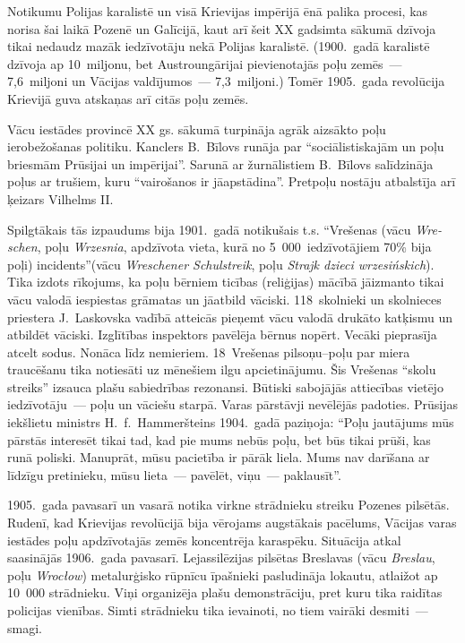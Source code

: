 \documentclass[twoside,a5paper,12pt,fleqn,openany]{extbook}
\newcommand{\pltxti}[1]{\textit{\textpolish{#1}}}
\newcommand{\detxti}[1]{\textit{\textgerman{#1}}}
\begin{document}
Notikumu Polijas karalistē un visā Krievijas impērijā ēnā palika procesi, kas norisa šai laikā Pozenē un Galīcijā, kaut arī šeit XX gadsimta sākumā dzīvoja tikai nedaudz mazāk iedzīvotāju nekā Polijas karalistē. (1900.~gadā karalistē dzīvoja ap 10~miljonu, bet Austroungārijai pievienotajās poļu zemēs~--- 7,6~miljoni un Vācijas valdījumos~--- 7,3~miljoni.) Tomēr 1905.~gada revolūcija Krievijā guva atskaņas arī citās poļu zemēs.

Vācu iestādes  provincē XX gs. sākumā turpināja agrāk aizsākto poļu ierobežošanas politiku. Kanclers B.~Bīlovs runāja par ``sociālistiskajām un poļu briesmām Prūsijai un impērijai''. Sarunā ar žurnālistiem B.~Bīlovs salīdzināja poļus ar trušiem, kuru ``vairošanos ir jāapstādina''. Pretpoļu nostāju atbalstīja arī ķeizars Vilhelms II.

Spilgtākais tās izpaudums bija 1901.~gadā notikušais t.s. ``Vrešenas (vācu \detxti{Wreschen}, poļu \pltxti{Wrzesnia}, apdzīvota vieta, kurā no 5~000~iedzīvotājiem 70\% bija poļi) incidents''(vācu \detxti{Wreschener Schulstreik}, poļu \pltxti{Strajk dzieci wrzesińskich}). Tika izdots rīkojums, ka poļu bērniem ticības (reliģijas) mācībā jāizmanto tikai vācu valodā iespiestas grāmatas un jāatbild vāciski. 118~skolnieki un skolnieces priestera J.~Laskovska vadībā atteicās pieņemt vācu valodā drukāto katķismu un atbildēt vāciski. Izglītības inspektors pavēlēja bērnus nopērt. Vecāki pieprasīja atcelt sodus. Nonāca līdz nemieriem. 18~Vrešenas pilsoņu--poļu par miera traucēšanu tika notiesāti uz mēnešiem ilgu apcietinājumu. Šis Vrešenas ``skolu streiks'' izsauca plašu sabiedrības rezonansi. Būtiski sabojājās attiecības vietējo iedzīvotāju~--- poļu un vāciešu starpā. Varas pārstāvji nevēlējās padoties. Prūsijas iekšlietu ministrs H.~f.~Hammeršteins 1904.~gadā paziņoja: ``Poļu jautājums mūs pārstās interesēt tikai tad, kad pie mums nebūs poļu, bet būs tikai prūši, kas runā poliski. Manuprāt, mūsu pacietība ir pārāk liela. Mums nav darīšana ar līdzīgu pretinieku, mūsu lieta~--- pavēlēt, viņu~--- paklausīt''.

1905.~gada pavasarī un vasarā notika virkne strādnieku streiku Pozenes pilsētās. Rudenī, kad Krievijas revolūcijā bija vērojams augstākais pacēlums, Vācijas varas iestādes poļu apdzīvotajās zemēs koncentrēja karaspēku. Situācija atkal saasinājās 1906.~gada pavasarī. Lejassilēzijas pilsētas Breslavas (vācu \detxti{Breslau}, poļu \pltxti{Wrocłow}) metalurģisko rūpnīcu īpašnieki pasludināja lokautu, atlaižot ap 10~000 strādnieku. Viņi organizēja plašu demonstrāciju, pret kuru tika raidītas policijas vienības. Simti strādnieku tika ievainoti, no tiem vairāki desmiti~--- smagi.
\end{document}
